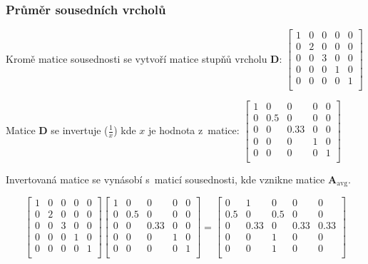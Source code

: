 \subsubsection{Průměr sousedních vrcholů}

Kromě matice sousednosti se vytvoří matice stupňů vrcholu $\mathbf{D}$:
$\left[ \begin{matrix}
1 & 0 & 0 & 0 & 0 \\
0 & 2 & 0 & 0 & 0 \\
0 & 0 & 3 & 0 & 0 \\
0 & 0 & 0 & 1 & 0 \\
0 & 0 & 0 & 0 & 1 \\
\end{matrix} \right]$

Matice $\mathbf{D}$ se invertuje ($\frac{1}{x}$) kde $x$ je hodnota z~matice:
$\left[ \begin{matrix}
1 & 0 & 0 & 0 & 0 \\
0 & 0.5 & 0 & 0 & 0 \\
0 & 0 & 0.33 & 0 & 0 \\
0 & 0 & 0 & 1 & 0 \\
0 & 0 & 0 & 0 & 1 \\
\end{matrix} \right]$

Invertovaná matice se vynásobí s~maticí sousednosti, kde vznikne matice $\mathbf{A_\mathrm{avg}}$.

$$
\left[ \begin{matrix}
1 & 0 & 0 & 0 & 0 \\
0 & 2 & 0 & 0 & 0 \\
0 & 0 & 3 & 0 & 0 \\
0 & 0 & 0 & 1 & 0 \\
0 & 0 & 0 & 0 & 1 \\
\end{matrix} \right]
\left[ \begin{matrix}
1 & 0 & 0 & 0 & 0 \\
0 & 0.5 & 0 & 0 & 0 \\
0 & 0 & 0.33 & 0 & 0 \\
0 & 0 & 0 & 1 & 0 \\
0 & 0 & 0 & 0 & 1 \\
\end{matrix} \right] =
\left[ \begin{matrix}
0 & 1 & 0 & 0 & 0 \\
0.5 & 0 & 0.5 & 0 & 0 \\
0 & 0.33 & 0 & 0.33 & 0.33 \\
0 & 0 & 1 & 0 & 0 \\
0 & 0 & 1 & 0 & 0 \\
\end{matrix} \right]
$$

